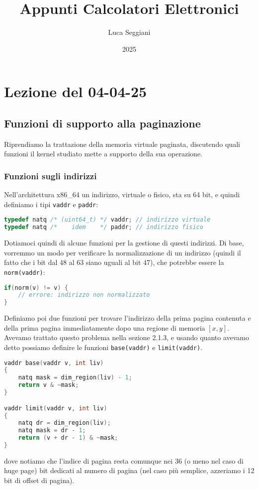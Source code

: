 \documentclass[a4paper,11pt]{article}
\title{Appunti Calcolatori Elettronici}
\author{Luca Seggiani}
\date{2025}
\begin{document}
\section{Lezione del 04-04-25}

\thispagestyle{empty}
\pagestyle{fancy}

\subsection{Funzioni di supporto alla paginazione}
Riprendiamo la trattazione della memoria virtuale paginata, discutendo quali funzioni il kernel studiato mette a supporto della sua operazione.

\subsubsection{Funzioni sugli indirizzi}
Nell'architettura x86\_64 un indirizzo, virtuale o fisico, sta su 64 bit, e quindi definiamo i tipi \lstinline|vaddr| e \lstinline|paddr|:
\begin{lstlisting}[language=C++, style=codestyle]	
typedef natq /* (uint64_t) */ vaddr; // indirizzo virtuale
typedef natq /*    idem    */ paddr; // indirizzo fisico 
\end{lstlisting}

Dotiamoci quindi di alcune funzioni per la gestione di questi indirizzi.
Di base, vorremmo un modo per verificare la normalizzazione di un indirizzo (quindi il fatto che i bit dal 48 al 63 siano uguali al bit 47), che potrebbe essere la \lstinline|norm(vaddr)|:
\begin{lstlisting}[language=C++, style=codestyle]	
if(norm(v) != v) {
	// errore: indirizzo non normalizzato
}
\end{lstlisting}

Definiamo poi due funzioni per trovare l'indirizzo della prima pagina contenuta e della prima pagina immediatamente dopo una regione di memoria $[x, y]$.
Avevamo trattato questo problema nella sezione 2.1.3, e usando quanto avevamo detto possiamo definire le funzioni \lstinline|base(vaddr)| e \lstinline|limit(vaddr)|.
\begin{lstlisting}[language=C++, style=codestyle]	
vaddr base(vaddr v, int liv)
{
	natq mask = dim_region(liv) - 1;
	return v & ~mask;
}

vaddr limit(vaddr v, int liv)
{
	natq dr = dim_region(liv);
	natq mask = dr - 1;
	return (v + dr - 1) & ~mask;
}
\end{lstlisting}
dove notiamo che l'indice di pagina resta comunque nei 36 (o meno nel caso di huge page) bit dedicati al numero di pagina (nel caso più semplice, azzeriamo i 12 bit di offset di pagina). 
\end{document}
